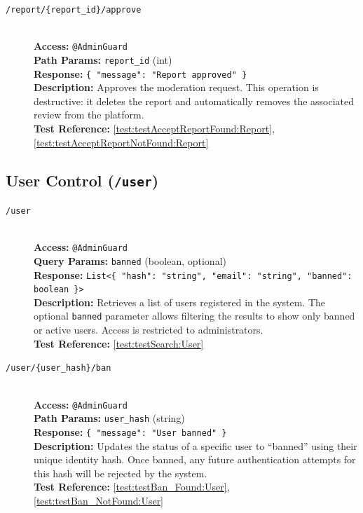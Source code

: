 \begin{description}
	\item[\POST \quad \texttt{/report/\{report\_id\}/approve}] \hfill \\
	\textbf{Access:} \texttt{@AdminGuard} \\
	\textbf{Path Params:} \texttt{report\_id} (int) \\
	\textbf{Response:} \texttt{\{ "message": "Report approved" \}} \\
	\textbf{Description:} Approves the moderation request. This operation is destructive: it deletes the report and automatically removes the associated review from the platform.\\
	\textbf{Test Reference:} \ref{test:testAcceptReportFound:Report}, \ref{test:testAcceptReportNotFound:Report}
\end{description}

\subsection{User Control (\texttt{/user})}
\begin{description}
	\item[\GET \quad \texttt{/user}] \hfill \\
	\textbf{Access:} \texttt{@AdminGuard} \\
	\textbf{Query Params:} \texttt{banned} (boolean, optional) \\
	\textbf{Response:} \texttt{List<\{ "hash": "string", "email": "string", "banned": boolean \}>} \\
	\textbf{Description:} Retrieves a list of users registered in the system. The optional \texttt{banned} parameter allows filtering the results to show only banned or active users. Access is restricted to administrators.\\
	\textbf{Test Reference:} \ref{test:testSearch:User}
	
	\item[\POST \quad \texttt{/user/\{user\_hash\}/ban}] \hfill \\
	\textbf{Access:} \texttt{@AdminGuard} \\
	\textbf{Path Params:} \texttt{user\_hash} (string) \\
	\textbf{Response:} \texttt{\{ "message": "User banned" \}} \\
	\textbf{Description:} Updates the status of a specific user to \enquote{banned} using their unique identity hash. Once banned, any future authentication attempts for this hash will be rejected by the system.\\
	\textbf{Test Reference:} \ref{test:testBan_Found:User}, \ref{test:testBan_NotFound:User}
\end{description}